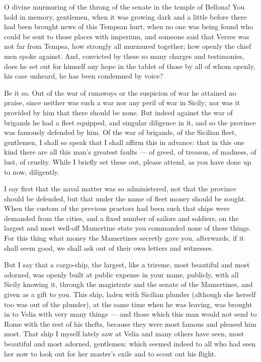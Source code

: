  O divine murmuring of the throng of the senate in the temple of Bellona! You hold in memory, gentlemen, when it was growing dark and a little before there had been brought news of this Tempsan hurt, when no one was being found who could be sent to those places with imperium, and someone said that Verres was not far from Tempsa, how strongly all murmured together; how openly the chief men spoke against. And, convicted by these so many charges and testimonies, does he set out for himself any hope in the tablet of those by all of whom openly, his case unheard, he has been condemned by voice?

 Be it so. Out of the war of runaways or the suspicion of war he attained no praise, since neither was such a war nor any peril of war in Sicily; nor was it provided by him that there should be none. But indeed against the war of brigands he had a fleet equipped, and singular diligence in it, and so the province was famously defended by him. Of the war of brigands, of the Sicilian fleet, gentlemen, I shall so speak that I shall affirm this in advance: that in this one kind there are all this man's greatest faults --- of greed, of treason, of madness, of lust, of cruelty. While I briefly set these out, please attend, as you have done up to now, diligently.

 I say first that the naval matter was so administered, not that the province should be defended, but that under the name of fleet money should be sought. When the custom of the previous praetors had been such that ships were demanded from the cities, and a fixed number of sailors and soldiers, on the largest and most well-off Mamertine state you commanded none of these things. For this thing what money the Mamertines secretly gave you, afterwards, if it shall seem good, we shall ask out of their own letters and witnesses.

 But I say that a cargo-ship, the largest, like a trireme, most beautiful and most adorned, was openly built at public expense in your name, publicly, with all Sicily knowing it, through the magistrate and the senate of the Mamertines, and given as a gift to you. This ship, laden with Sicilian plunder (although she herself too was out of the plunder), at the same time when he was leaving, was brought in to Velia with very many things --- and those which this man would not send to Rome with the rest of his thefts, because they were most famous and pleased him most. That ship I myself lately saw at Velia and many others have seen, most beautiful and most adorned, gentlemen: which seemed indeed to all who had seen her now to look out for her master's exile and to scout out his flight.

